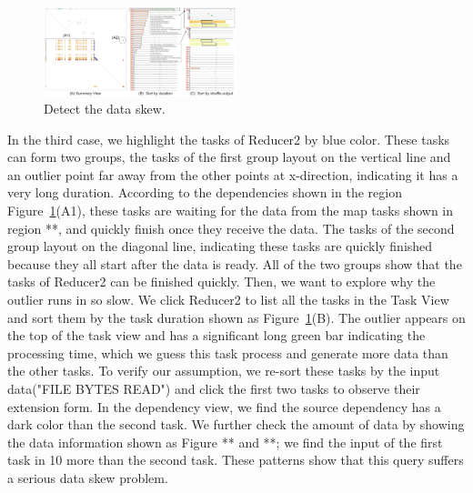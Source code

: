 \begin{figure}[t]
	\centering
	\includegraphics[width=0.5\textwidth]{figures/case_study/CaseStudy3.pdf}
	\vspace{-3mm}
	\caption{Detect the data skew.}
	\label{fig:casestudy3}
	\vspace{-3mm}
\end{figure}

In the third case, we highlight the tasks of Reducer2 by blue color. These tasks can form two groups, the tasks of the first group layout on the vertical line and an outlier point far away from the other points at x-direction, indicating it has a very long duration.
According to the dependencies shown in the region Figure~\ref{fig:casestudy3}(A1), these tasks are waiting for the data from the map tasks shown in region **, and quickly finish once they receive the data. The tasks of the second group layout on the diagonal line, indicating these tasks are quickly finished because they all start after the data is ready. All of the two groups show that the tasks of Reducer2 can be finished quickly. Then, we want to explore why the outlier runs in so slow. We click Reducer2 to list all the tasks in the Task View and sort them by the task duration shown as Figure~\ref{fig:casestudy3}(B). The outlier appears on the top of the task view and has a significant long green bar indicating the processing time, which we guess this task process and generate more data than the other tasks. To verify our assumption, we re-sort these tasks by the input data("FILE BYTES READ") and click the first two tasks to observe their extension form. In the dependency view, we find the source dependency has a dark color than the second task. We further check the amount of data by showing the data information shown as Figure ** and **; we find the input of the first task in 10 more than the second task. These patterns show that this query suffers a serious data skew problem.  

